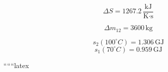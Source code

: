 \begin{equation*}
\Delta S = 1267.2 \, \frac{\text{kJ}}{\text{K} \cdot \text{s}}
\end{equation*}

\begin{equation*}
\Delta m_{12} = 3600 \, \text{kg}
\end{equation*}

\begin{equation*}
s_2 (100^\circ C) = 1.306 \, \text{GJ}
\end{equation*}
\begin{equation*}
s_1 (70^\circ C) = 0.959 \, \text{GJ}
\end{equation*}

``````latex


